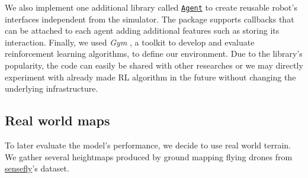 \documentclass[../document.tex]{subfiles}
\begin{document}
We also implement one additional library called \href{https://github.com/FrancescoSaverioZuppichini/Master-Thesis/tree/master/core/simulation/agent}{\texttt{Agent}} to create reusable robot's interfaces independent from the simulator. The package supports callbacks that can be attached to each agent adding additional features such as storing its interaction. Finally, we used \emph{Gym} \cite{gym}, a toolkit to develop and evaluate reinforcement learning algorithms, to define our environment. Due to the library's popularity, the code can easily be shared with other researches or we may directly experiment with already made RL algorithm in the future without changing the underlying infrastructure.

\subsection{Real world maps}
To later evaluate the model's performance, we decide to use real world terrain. We gather several heightmaps produced by ground mapping flying drones from \href{https://www.sensefly.com/education/datasets/}{sensefly}'s dataset. 
\end{document}
